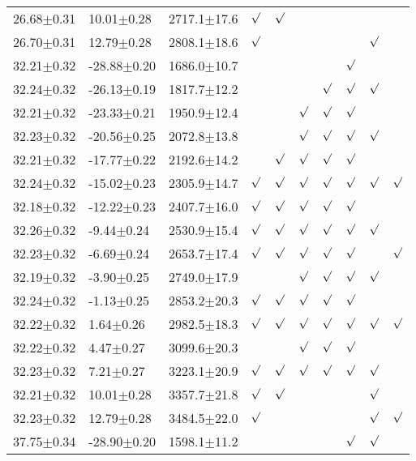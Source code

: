 \begin{table}[h]
\begin{center}
\begin{tabular}{llllllllll}
26.68$\pm$0.31 & 10.01$\pm$0.28 & 2717.1$\pm$17.6& $\surd$ & $\surd$ & & & & & \\
26.70$\pm$0.31 & 12.79$\pm$0.28 & 2808.1$\pm$18.6& $\surd$ & & & & & $\surd$ & \\
32.21$\pm$0.32 & -28.88$\pm$0.20 & 1686.0$\pm$10.7& & & & & $\surd$ & & \\
32.24$\pm$0.32 & -26.13$\pm$0.19 & 1817.7$\pm$12.2& & & & $\surd$ & $\surd$ & $\surd$ & \\
32.21$\pm$0.32 & -23.33$\pm$0.21 & 1950.9$\pm$12.4& & & $\surd$ & $\surd$ & $\surd$ & & \\
32.23$\pm$0.32 & -20.56$\pm$0.25 & 2072.8$\pm$13.8& & & $\surd$ & $\surd$ & $\surd$ & $\surd$ & \\
32.21$\pm$0.32 & -17.77$\pm$0.22 & 2192.6$\pm$14.2& & $\surd$ & $\surd$ & $\surd$ & $\surd$ & & \\
32.24$\pm$0.32 & -15.02$\pm$0.23 & 2305.9$\pm$14.7& $\surd$ & $\surd$ & $\surd$ & $\surd$ & $\surd$ & $\surd$ & $\surd$ \\
32.18$\pm$0.32 & -12.22$\pm$0.23 & 2407.7$\pm$16.0& $\surd$ & $\surd$ & $\surd$ & $\surd$ & $\surd$ & & \\
32.26$\pm$0.32 & -9.44$\pm$0.24 & 2530.9$\pm$15.4& $\surd$ & $\surd$ & $\surd$ & $\surd$ & $\surd$ & $\surd$ & \\
32.23$\pm$0.32 & -6.69$\pm$0.24 & 2653.7$\pm$17.4& $\surd$ & $\surd$ & $\surd$ & $\surd$ & $\surd$ & & $\surd$ \\
32.19$\pm$0.32 & -3.90$\pm$0.25 & 2749.0$\pm$17.9& & & $\surd$ & $\surd$ & $\surd$ & $\surd$ & \\
32.24$\pm$0.32 & -1.13$\pm$0.25 & 2853.2$\pm$20.3& $\surd$ & $\surd$ & $\surd$ & $\surd$ & $\surd$ & & \\
32.22$\pm$0.32 & 1.64$\pm$0.26 & 2982.5$\pm$18.3& $\surd$ & $\surd$ & $\surd$ & $\surd$ & $\surd$ & $\surd$ & $\surd$ \\
32.22$\pm$0.32 & 4.47$\pm$0.27 & 3099.6$\pm$20.3& & & $\surd$ & $\surd$ & $\surd$ & & \\
32.23$\pm$0.32 & 7.21$\pm$0.27 & 3223.1$\pm$20.9& $\surd$ & $\surd$ & $\surd$ & $\surd$ & $\surd$ & $\surd$ & \\
32.21$\pm$0.32 & 10.01$\pm$0.28 & 3357.7$\pm$21.8& $\surd$ & $\surd$ & & & & $\surd$ & \\
32.23$\pm$0.32 & 12.79$\pm$0.28 & 3484.5$\pm$22.0& $\surd$ & & & & & $\surd$ & $\surd$ \\
37.75$\pm$0.34 & -28.90$\pm$0.20 & 1598.1$\pm$11.2& & & & & $\surd$ & $\surd$ & \\

\end{tabular}
\end{center}
\end{table}
